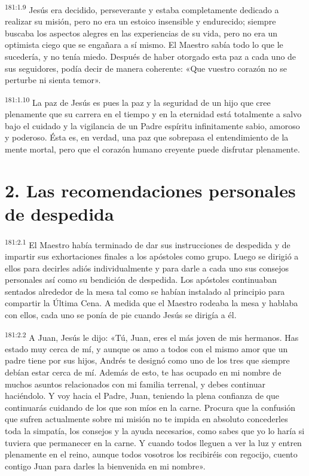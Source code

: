 \par 
\textsuperscript{181:1.9} Jesús era decidido, perseverante y estaba completamente dedicado a realizar su misión, pero no era un estoico insensible y endurecido; siempre buscaba los aspectos alegres en las experiencias de su vida, pero no era un optimista ciego que se engañara a sí mismo. El Maestro sabía todo lo que le sucedería, y no tenía miedo. Después de haber otorgado esta paz a cada uno de sus seguidores, podía decir de manera coherente: «Que vuestro corazón no se perturbe ni sienta temor».

\par 
\textsuperscript{181:1.10} La paz de Jesús es pues la paz y la seguridad de un hijo que cree plenamente que su carrera en el tiempo y en la eternidad está totalmente a salvo bajo el cuidado y la vigilancia de un Padre espíritu infinitamente sabio, amoroso y poderoso. Ésta es, en verdad, una paz que sobrepasa el entendimiento de la mente mortal, pero que el corazón humano creyente puede disfrutar plenamente.

\section*{2. Las recomendaciones personales de despedida}
\par 
\textsuperscript{181:2.1} El Maestro había terminado de dar sus instrucciones de despedida y de impartir sus exhortaciones finales a los apóstoles como grupo. Luego se dirigió a ellos para decirles adiós individualmente y para darle a cada uno sus consejos personales así como su bendición de despedida. Los apóstoles continuaban sentados alrededor de la mesa tal como se habían instalado al principio para compartir la Última Cena. A medida que el Maestro rodeaba la mesa y hablaba con ellos, cada uno se ponía de pie cuando Jesús se dirigía a él.

\par 
\textsuperscript{181:2.2} A Juan, Jesús le dijo: «Tú, Juan, eres el más joven de mis hermanos. Has estado muy cerca de mí, y aunque os amo a todos con el mismo amor que un padre tiene por sus hijos, Andrés te designó como uno de los tres que siempre debían estar cerca de mí. Además de esto, te has ocupado en mi nombre de muchos asuntos relacionados con mi familia terrenal, y debes continuar haciéndolo. Y voy hacia el Padre, Juan, teniendo la plena confianza de que continuarás cuidando de los que son míos en la carne. Procura que la confusión que sufren actualmente sobre mi misión no te impida en absoluto concederles toda la simpatía, los consejos y la ayuda necesarios, como sabes que yo lo haría si tuviera que permanecer en la carne. Y cuando todos lleguen a ver la luz y entren plenamente en el reino, aunque todos vosotros los recibiréis con regocijo, cuento contigo Juan para darles la bienvenida en mi nombre».

